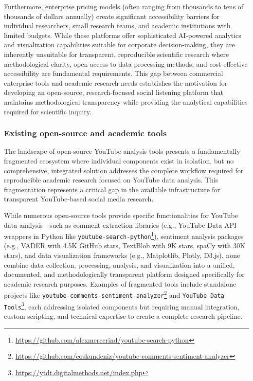 Furthermore, enterprise pricing models (often ranging from thousands to tens of thousands of dollars annually) create significant accessibility barriers for individual researchers, small research teams, and academic institutions with limited budgets. While these platforms offer sophisticated AI-powered analytics and visualization capabilities suitable for corporate decision-making, they are inherently unsuitable for transparent, reproducible scientific research where methodological clarity, open access to data processing methods, and cost-effective accessibility are fundamental requirements. This gap between commercial enterprise tools and academic research needs establishes the motivation for developing an open-source, research-focused social listening platform that maintains methodological transparency while providing the analytical capabilities required for scientific inquiry.

\subsubsection{Existing open-source and academic tools}

The landscape of open-source YouTube analysis tools presents a fundamentally fragmented ecosystem where individual components exist in isolation, but no comprehensive, integrated solution addresses the complete workflow required for reproducible academic research focused on YouTube data analysis. This fragmentation represents a critical gap in the available infrastructure for transparent YouTube-based social media research.

While numerous open-source tools provide specific functionalities for YouTube data analysis—such as comment extraction libraries (e.g., YouTube Data API wrappers in Python like \texttt{youtube-search-python}\footnote{\url{https://github.com/alexmercerind/youtube-search-python}}), sentiment analysis packages (e.g., VADER with 4.5K GitHub stars, TextBlob with 9K stars, spaCy with 30K stars), and data visualization frameworks (e.g., Matplotlib, Plotly, D3.js), none combine data collection, processing, analysis, and visualization into a unified, documented, and methodologically transparent platform designed specifically for academic research purposes. Examples of fragmented tools include standalone projects like \texttt{youtube-comments-sentiment-analyzer}\footnote{\url{https://github.com/coskundeniz/youtube-comments-sentiment-analyzer}} and \texttt{YouTube Data Tools}\footnote{\url{https://ytdt.digitalmethods.net/index.php}}, each addressing isolated components but requiring manual integration, custom scripting, and technical expertise to create a complete research pipeline.

